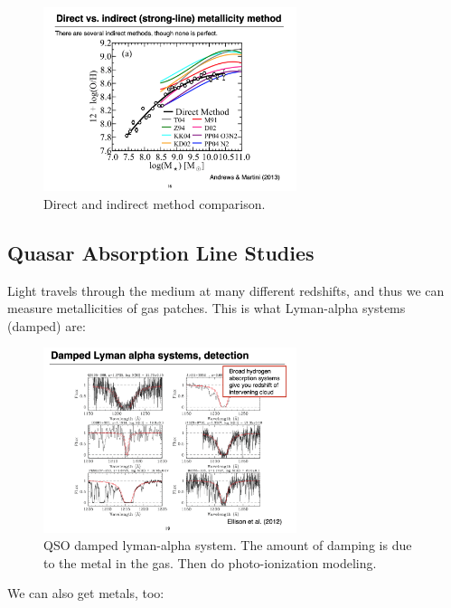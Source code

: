 \documentclass{article}
\begin{document}
\begin{figure}
    \centering
    \includegraphics[width=0.66\textwidth]{figs/Screen Shot 2021-10-06 at 10.53.21 AM.png}
    \caption{Direct and indirect method comparison. }
    \label{fig:direct_v_indirect}
\end{figure}

\subsection{Quasar Absorption Line Studies}

Light travels through the medium at many different redshifts, and thus we can measure metallicities of gas patches. This is what Lyman-alpha systems (damped) are:

\begin{figure}
    \centering
    \includegraphics[width=0.66\textwidth]{figs/Screen Shot 2021-10-06 at 10.55.26 AM.png}
    \caption{QSO damped lyman-alpha system. The amount of damping is due to the metal in the gas. Then do photo-ionization modeling. }
    \label{fig:lyman_alpha}
\end{figure}

We can also get metals, too:
\end{document}
